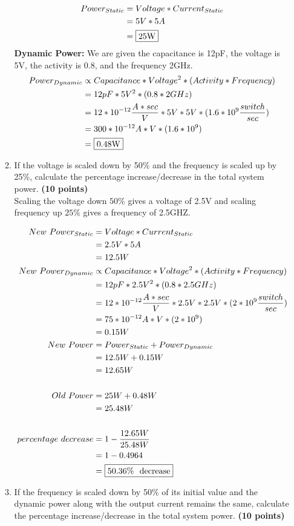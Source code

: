 \documentclass[a4paper, 15pt]{exam}
\begin{document}
\begin{enumerate}
\begin{enumerate}
  \begin{align*} 
   			Power_{Static} &= Voltage * Current_{Static} \\
   			&= 5V * 5A \\
   			&= \fbox{25W}
   	\end{align*}
   	\newpage
   	\textbf{Dynamic Power:} We are given the capacitance is 12pF, the voltage is 5V, the activity is 0.8, and the frequency 2GHz.
   	\begin{align*} 
   			Power_{Dynamic} &\propto Capacitance * Voltage^2 * (Activity * Frequency) \\
   			&= 12pF * 5V^2 * (0.8 * 2GHz) \\
   			&= 12 * 10^{-12} \frac{A * sec}{V} * 5V * 5V * (1.6 * 10^9 \frac{switch}{sec})\\
   			&= 300 * 10^{-12} A * V * (1.6 * 10^9)\\
   			&= \fbox{0.48W}
   	\end{align*}
        \item If the voltage is scaled down by 50\% and the frequency is scaled up by 25\%, calculate the percentage increase/decrease in the total system power.   \textbf{(10 points)} \\
     Scaling the voltage down $50\%$ gives a voltage of 2.5V and scaling frequency up $25\%$ gives a frequency of 2.5GHZ.
     
     \begin{align*}
   			New \ Power_{Static} &= Voltage * Current_{Static} \\
   			&= 2.5V * 5A \\
   			&= 12.5W \\
   			New \ Power_{Dynamic} &\propto Capacitance * Voltage^2 * (Activity * Frequency) \\
   			&= 12pF * 2.5V^2 * (0.8 * 2.5GHz) \\
   			&= 12 * 10^{-12} \frac{A * sec}{V} * 2.5V * 2.5V * (2 * 10^9 \frac{switch}{sec})\\
   			&= 75 * 10^{-12} A * V * (2 * 10^9)\\
   			&= 0.15W \\
   			New \ Power &= Power_{Static} + Power_{Dynamic} \\
   			&= 12.5W + 0.15W \\
   			&= 12.65W\\ \\
   			Old \ Power &= 25W + 0.48W \\
   			&= 25.48W \\ \\
   			percentage \ decrease &= 1 - \frac{12.65W}{25.48W} \\
   			&= 1 - 0.4964 \\
   			&= \fbox{50.36\% \ decrease}
   	\end{align*}
        \item If the frequency is scaled down by 50\% of its initial value and the dynamic power along with the output current remains the same, calculate the percentage increase/decrease in the total system power.  \textbf{(10 points)} \\
        


\end{enumerate}
\end{enumerate}
\end{document}
